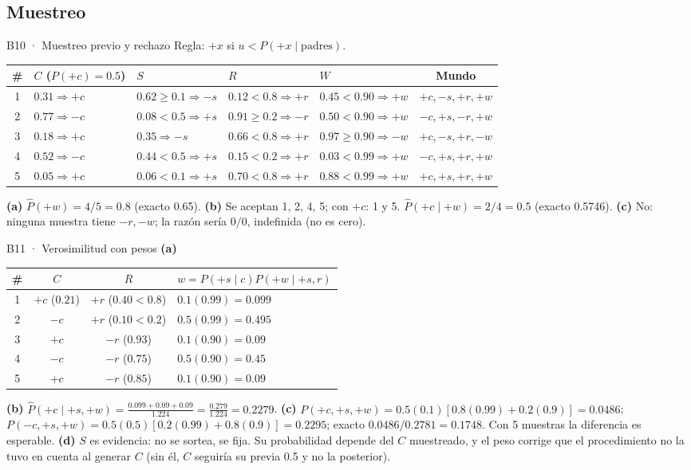 \subsection{Muestreo}

\begin{solucion}{B10 · Muestreo previo y rechazo}
Regla: $+x$ si $u<P(+x\mid\text{padres})$.
\begin{center}\small
\begin{tabular}{c|llll|c}
\# & $C$ ($P(+c)=0.5$) & $S$ & $R$ & $W$ & Mundo\\\hline
1 & $0.31\Rightarrow+c$ & $0.62\ge0.1\Rightarrow-s$ & $0.12<0.8\Rightarrow+r$ & $0.45<0.90\Rightarrow+w$ & $+c,-s,+r,+w$\\
2 & $0.77\Rightarrow-c$ & $0.08<0.5\Rightarrow+s$ & $0.91\ge0.2\Rightarrow-r$ & $0.50<0.90\Rightarrow+w$ & $-c,+s,-r,+w$\\
3 & $0.18\Rightarrow+c$ & $0.35\Rightarrow-s$ & $0.66<0.8\Rightarrow+r$ & $0.97\ge0.90\Rightarrow-w$ & $+c,-s,+r,-w$\\
4 & $0.52\Rightarrow-c$ & $0.44<0.5\Rightarrow+s$ & $0.15<0.2\Rightarrow+r$ & $0.03<0.99\Rightarrow+w$ & $-c,+s,+r,+w$\\
5 & $0.05\Rightarrow+c$ & $0.06<0.1\Rightarrow+s$ & $0.70<0.8\Rightarrow+r$ & $0.88<0.99\Rightarrow+w$ & $+c,+s,+r,+w$
\end{tabular}
\end{center}
\textbf{(a)} $\hat P(+w)=4/5=\mathbf{0.8}$ (exacto 0.65).
\textbf{(b)} Se aceptan 1, 2, 4, 5; con $+c$: 1 y 5. $\hat P(+c\mid+w)=2/4=\mathbf{0.5}$ (exacto 0.5746).
\textbf{(c)} No: ninguna muestra tiene $-r,-w$; la razón sería $0/0$, indefinida (no es cero).
\end{solucion}

\begin{solucion}{B11 · Verosimilitud con pesos}
\textbf{(a)}
\begin{center}\small
\begin{tabular}{c|cc|l}
\# & $C$ & $R$ & $w=P(+s\mid c)P(+w\mid+s,r)$\\\hline
1 & $+c$ ($0.21$) & $+r$ ($0.40<0.8$) & $0.1(0.99)=0.099$\\
2 & $-c$ & $+r$ ($0.10<0.2$) & $0.5(0.99)=0.495$\\
3 & $+c$ & $-r$ ($0.93$) & $0.1(0.90)=0.09$\\
4 & $-c$ & $-r$ ($0.75$) & $0.5(0.90)=0.45$\\
5 & $+c$ & $-r$ ($0.85$) & $0.1(0.90)=0.09$
\end{tabular}
\end{center}
\textbf{(b)} $\hat P(+c\mid+s,+w)=\frac{0.099+0.09+0.09}{1.224}=\frac{0.279}{1.224}=\mathbf{0.2279}$.
\textbf{(c)} $P(+c,+s,+w)=0.5(0.1)[0.8(0.99)+0.2(0.9)]=0.0486$; $P(-c,+s,+w)=0.5(0.5)[0.2(0.99)+0.8(0.9)]=0.2295$;
exacto $0.0486/0.2781=\mathbf{0.1748}$. Con 5 muestras la diferencia es esperable.
\textbf{(d)} $S$ es evidencia: no se sortea, se fija. Su probabilidad depende del $C$ muestreado, y el peso corrige que el
procedimiento no la tuvo en cuenta al generar $C$ (sin él, $C$ seguiría su previa 0.5 y no la posterior).
\end{solucion}

